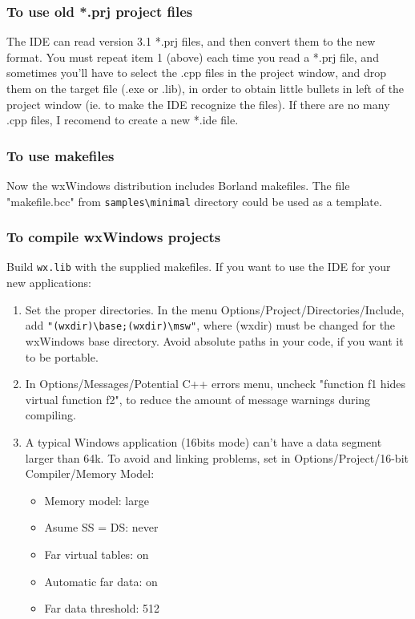 \subsubsection{To use old *.prj project files}

The IDE can read version 3.1 *.prj files, and then convert them to the
new format. You must repeat item 1 (above) each time you read
a *.prj file, and sometimes you'll have to select the .cpp files in 
the project window, and drop them on the target file (.exe or .lib), 
in order to obtain little bullets in left of the project window 
(ie. to make the IDE recognize the files). If there are no many .cpp 
files, I recomend to create a new *.ide file.

\subsubsection{To use makefiles}

Now the wxWindows distribution includes Borland makefiles.
The file "makefile.bcc" from \verb$samples\minimal$ directory could
be used as a template.

\subsubsection{To compile wxWindows projects}

Build \verb$wx.lib$ with the supplied makefiles. If you want to use the IDE
for your new applications:

\begin{enumerate}
\item Set the proper directories. In the menu Options/Project/Directories/Include,
add \verb$"(wxdir)\base;(wxdir)\msw"$, where (wxdir) must be
changed for the wxWindows base directory. Avoid absolute paths 
in your code, if you want it to be portable. 
\item In Options/Messages/Potential C++ errors menu, uncheck
"function f1 hides virtual function f2", to reduce
the amount of message warnings during compiling.
\item A typical Windows application (16bits mode) can't have a data segment
larger than 64k. To avoid 
\rtfsp{} and linking problems,
set in Options/Project/16-bit Compiler/Memory Model:
\begin{itemize}
\item Memory model: large
\item Asume SS = DS: never
\item Far virtual tables: on
\item Automatic far data: on
\item Far data threshold: 512
\end{itemize}
\end{enumerate}

